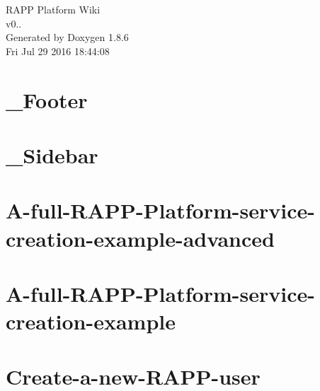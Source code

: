 \documentclass[twoside]{book}
\newcommand{\clearemptydoublepage}{%
  \newpage{\pagestyle{empty}\cleardoublepage}%
}
\begin{document}
\hypersetup{pageanchor=false}
\begin{titlepage}
\vspace*{7cm}
\begin{center}%
{\Large R\-A\-P\-P Platform Wiki \\[1ex]\large v0.. }\\
\vspace*{1cm}
{\large Generated by Doxygen 1.8.6}\\
\vspace*{0.5cm}
{\small Fri Jul 29 2016 18:44:08}\\
\end{center}
\end{titlepage}
\clearemptydoublepage
\tableofcontents
\clearemptydoublepage
{}
\hypersetup{pageanchor=true}

\chapter{\-\_\-\-Footer}
\label{md_rapp-platform_8wiki__Footer}
\hypertarget{md_rapp-platform_8wiki__Footer}{}

\chapter{\-\_\-\-Sidebar}
\label{md_rapp-platform_8wiki__Sidebar}
\hypertarget{md_rapp-platform_8wiki__Sidebar}{}

\chapter{A-\/full-\/\-R\-A\-P\-P-\/\-Platform-\/service-\/creation-\/example-\/advanced}
\label{md_rapp-platform_8wiki_A-full-RAPP-Platform-service-creation-example-advanced}
\hypertarget{md_rapp-platform_8wiki_A-full-RAPP-Platform-service-creation-example-advanced}{}

\chapter{A-\/full-\/\-R\-A\-P\-P-\/\-Platform-\/service-\/creation-\/example}
\label{md_rapp-platform_8wiki_A-full-RAPP-Platform-service-creation-example}
\hypertarget{md_rapp-platform_8wiki_A-full-RAPP-Platform-service-creation-example}{}

\chapter{Create-\/a-\/new-\/\-R\-A\-P\-P-\/user}
\label{md_rapp-platform_8wiki_Create-a-new-RAPP-user}
\hypertarget{md_rapp-platform_8wiki_Create-a-new-RAPP-user}{}

\end{document}
